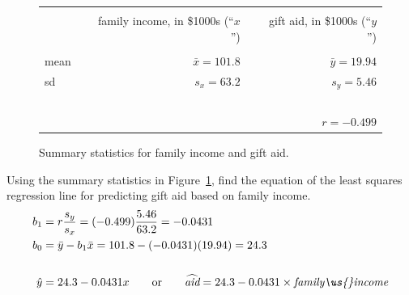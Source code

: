 \begin{figure}[ht]
\centering
\begin{tabular}{l rr}
\hline
\vspace{-4mm} & & \\
\vspace{0.4mm}	&	\ \ family income, in \$1000s (``$x$'')	& \ \ gift aid, in \$1000s (``$y$'') \\
\hline
  \vspace{-3.9mm} & & \\
mean	& $\bar{x} = 101.8$		& $\bar{y} = 19.94$ \\
sd		& $s_x = 63.2$		& $s_y = 5.46$\vspace{0.4mm} \\
\hline
\vspace{-4mm}\ &\\
	& \multicolumn{2}{r}{$r=-0.499$} \\
\hline
\end{tabular}
\caption{Summary statistics for family income and gift aid.}
\label{summaryStatsOfSATGPAData}
\end{figure}

\D{\newpage}
 
\begin{examplewrap}
\begin{nexample} 
{Using the summary statistics in Figure~\ref{summaryStatsOfSATGPAData}, find the equation of the least squares regression line for predicting gift aid based on family income.}
\begin{align*}
b_1 &= r\frac{s_y}{s_x} = (-0.499)\frac{5.46}{63.2} = -0.0431 \\
b_0 & = \bar{y} - b_1\bar{x} = 101.8 - (-0.0431)(19.94) = 24.3\\
\\
\hat{y}&=24.3 - 0.0431x
	\qquad\text{or}\qquad
	\widehat{\textit{aid}} = 24.3 - 0.0431\times \textit{family\us{}income}
\end{align*}
\end{nexample}
\end{examplewrap}
\label{findingTheSlopeOfTheLSRLineForIncomeAndAid}

